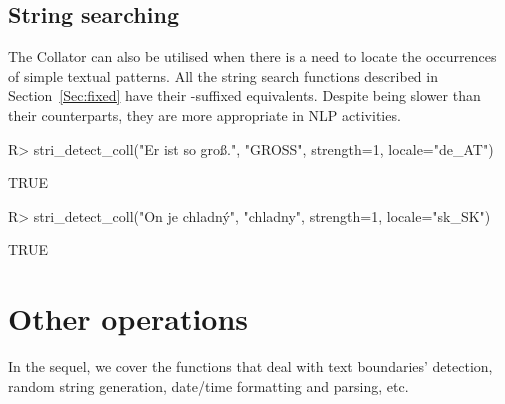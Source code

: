 \documentclass[nojss]{jss}
\begin{document}







\subsection{String searching}

The  Collator can also be utilised
when there is a need to locate the occurrences of simple textual patterns.
All the string search functions described in Section~\ref{Sec:fixed}
have their -suffixed equivalents.
Despite being slower than their  counterparts,
they are more appropriate in NLP activities.

\begin{Schunk}
\begin{Sinput}
R> stri_detect_coll("Er ist so groß.", "GROSS", strength=1, locale="de_AT")
\end{Sinput}
\begin{Soutput}
[1] TRUE
\end{Soutput}
\begin{Sinput}
R> stri_detect_coll("On je chladný", "chladny", strength=1, locale="sk_SK")
\end{Sinput}
\begin{Soutput}
[1] TRUE
\end{Soutput}
\end{Schunk}





\section{Other operations}\label{Sec:other}

In the sequel, we cover the functions that deal with
text boundaries' detection, random string generation,
date/time formatting and parsing, etc.
\end{document}
